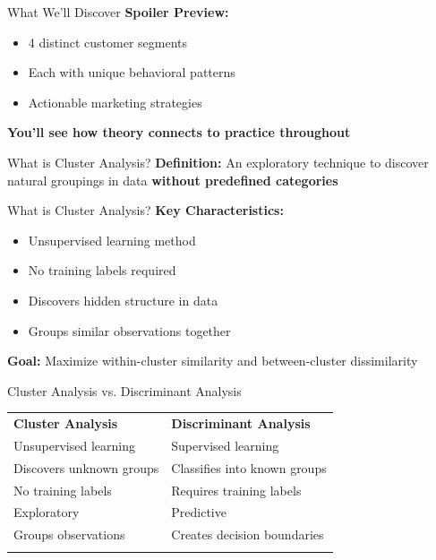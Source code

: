 \documentclass[aspectratio=169,ignorenonframetext]{beamer}
\begin{document}
\begin{frame}{What We'll Discover}
\textbf{Spoiler Preview:}

\begin{itemize}
\item
  4 distinct customer segments
\item
  Each with unique behavioral patterns
\item
  Actionable marketing strategies
\end{itemize}

\textbf{You'll see how theory connects to practice throughout}
\end{frame}

\begin{frame}{What is Cluster Analysis?}
\textbf{Definition:} An exploratory technique to discover natural
groupings in data \textbf{without predefined categories}
\end{frame}

\begin{frame}{What is Cluster Analysis?}
\textbf{Key Characteristics:}

\begin{itemize}
\item
  Unsupervised learning method
\item
  No training labels required
\item
  Discovers hidden structure in data
\item
  Groups similar observations together
\end{itemize}

\textbf{Goal:} Maximize within-cluster similarity and between-cluster
dissimilarity
\end{frame}

\begin{frame}{Cluster Analysis vs. Discriminant Analysis}
{\def\LTcaptype{none} %
\begin{longtable}[]{@{}
  >{\raggedright\arraybackslash}p{}
  >{\raggedright\arraybackslash}p{}@{}}
\toprule\noalign{}
\endhead
\textbf{Cluster Analysis} & \textbf{Discriminant Analysis} \\
Unsupervised learning & Supervised learning \\
Discovers unknown groups & Classifies into known groups \\
No training labels & Requires training labels \\
Exploratory & Predictive \\
Groups observations & Creates decision boundaries \\
\bottomrule\noalign{}
\end{longtable}
}
\end{frame}
\end{document}
